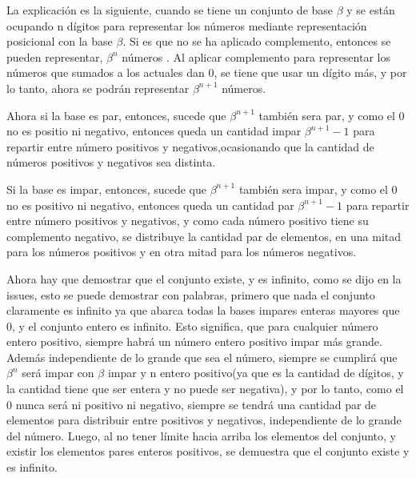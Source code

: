 \documentclass[letter]{article}
\begin{document}
\begin{pregunta}{2}
	La explicación es la siguiente, cuando se tiene un conjunto de base $\beta$ y se están ocupando n dígitos para representar los números mediante representación posicional con la base  $\beta$. Si es que no se ha aplicado complemento, entonces se pueden representar, $\beta^{n}$ números . Al aplicar complemento para representar los números que sumados a los actuales dan 0, se tiene que usar un dígito más, y por lo tanto, ahora se podrán representar $\beta^{n+1}$ números.
	
	Ahora si la base es par, entonces, sucede que  $\beta^{n+1}$ también sera par, y como el 0 no es positio ni negativo, entonces queda un cantidad impar $\beta^{n+1} - 1$ para repartir entre número positivos y negativos,ocasionando que la cantidad de números positivos y negativos sea distinta. 
	
	Si la base es impar,  entonces, sucede que  $\beta^{n+1}$ también sera impar, y como el 0 no es positivo ni negativo, entonces queda un cantidad par $\beta^{n+1} - 1$ para repartir entre número positivos y negativos, y como cada número positivo tiene su complemento negativo, se distribuye la cantidad par de elementos, en una mitad para los números positivos y en otra mitad para los números negativos.
	$$\quad$$
	
	Ahora hay que demostrar que el conjunto existe, y es infinito, como se dijo en la issues, esto se puede demostrar con palabras, primero que nada el conjunto claramente es infinito ya que abarca todas la bases impares enteras mayores que 0, y el conjunto entero es infinito. Esto significa, que para cualquier número entero positivo, siempre habrá un número entero positivo impar más grande. Además independiente de lo grande que sea el número, siempre se cumplirá que  $\beta^{n}$ será impar con $\beta$ impar y n entero positivo(ya que es la cantidad de dígitos, y la cantidad tiene que ser entera y no puede ser negativa), y por lo tanto, como el 0 nunca será ni positivo ni negativo, siempre se tendrá una cantidad par de elementos para distribuir entre positivos y negativos, independiente de lo grande del número. Luego, al no tener límite hacia arriba los elementos del conjunto, y existir los elementos pares enteros positivos, se demuestra que el conjunto existe y es infinito.
\end{pregunta}
\end{document}
